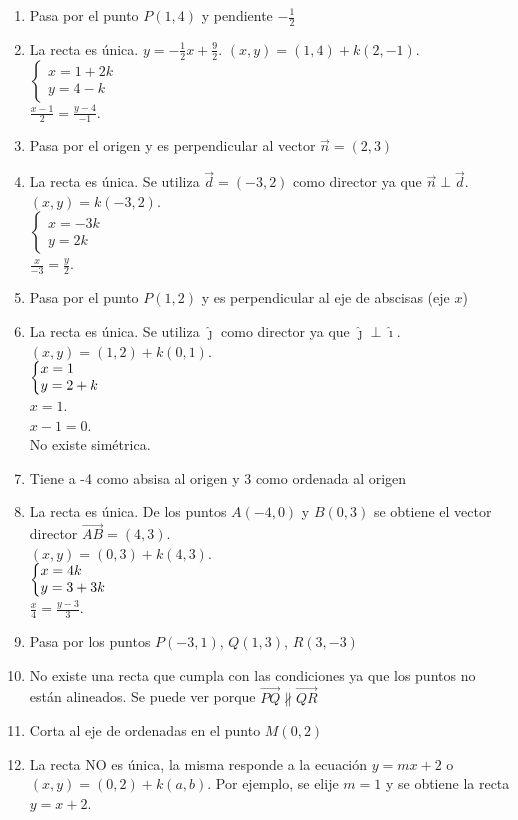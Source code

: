 \documentclass[a4paper]{article}
\newcommand{\answer}{\item[**]}
\newcommand{\SEL}[1]{\left\{\begin{matrix} #1 \end{matrix}\right.}
\begin{document}
\begin{enumerate}
\begin{enumerate} [label=(\alph*)]
		\item Pasa por el punto $P(1,4)$ y pendiente $\displaystyle{-\frac{1}{2}}$
		\answer La recta es única. $y=-\frac{1}{2}x+\frac{9}{2}$. $(x,y)=(1,4)+k(2,-1)$. \\ $\SEL{ x=1+2k \\ y=4-k }$ \\ $\displaystyle{\frac{x-1}{2}=\frac{y-4}{-1}}$.

		\item Pasa por el origen y es perpendicular al vector $\vec{n}=(2,3)$
		\answer La recta es única. Se utiliza $\vec{d}=(-3,2)$ como director ya que $\vec{n} \perp \vec{d}$. \\ $(x,y)=k(-3,2)$. \\ $\SEL{ x=-3k \\ y=2k }$ \\ $\displaystyle{\frac{x}{-3}=\frac{y}{2}}$.

		\item Pasa por el punto $P(1,2)$ y es perpendicular al eje de abscisas (eje $x$)
		\answer La recta es única. Se utiliza $\hat{\jmath}$ como director ya que $\hat{\jmath} \perp \hat{\imath}$. \\ $(x,y)=(1,2)+k(0,1)$. \\ $\SEL{ x=1 \hfill\\ y=2+k }$ \\ $x=1$. \\ $x-1=0$. \\ No existe simétrica.

		\item Tiene a -4 como absisa al origen y 3 como ordenada al origen
		\answer La recta es única. De los puntos $A(-4,0)$ y $B(0,3)$ se obtiene el vector director $\overrightarrow{AB}=(4,3)$. \\ $(x,y)=(0,3)+k(4,3)$. \\ $\SEL{ x=4k \hfill \\ y=3+3k }$ \\ $\displaystyle{\frac{x}{4}=\frac{y-3}{3}}$.

		\item Pasa por los puntos $P(-3,1)$, $Q(1,3)$, $R(3,-3)$
		\answer No existe una recta que cumpla con las condiciones ya que los puntos no están alineados. Se puede ver porque $\overrightarrow{PQ} \nparallel\overrightarrow{QR}$

		\item Corta al eje de ordenadas en el punto $M(0,2)$
		\answer La recta NO es única, la misma responde a la ecuación $y=mx+2$ o $(x,y)=(0,2)+k(a,b)$. Por ejemplo, se elije $m=1$ y se obtiene la recta $y=x+2$.


\end{enumerate}
\end{enumerate}
\end{document}
